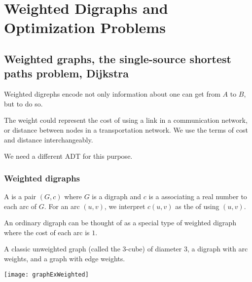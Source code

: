 \part{Weighted Digraphs and Optimization Problems}
\label{ch:weighted}


\chapter{Weighted graphs, the single-source shortest paths problem, Dijkstra} %

Weighted digrephs encode not only information about   one can get from $A$ to $B$, but
 to do so.

The weight could represent the cost of using a link
in a communication network, or distance between nodes in a
transportation network. We use the terms of cost and distance
interchangeably.

We need a different ADT for this purpose. 

\section{Weighted digraphs}
\label{sec:weighted}

\begin{Definition}
A  is a pair $(G, c)$ where $G$ is a digraph
and $c$ is a  associating a
real number to each arc of $G$. For an arc $(u,v)$, we interpret  $c(u, v)$ as the  of using $(u, v)$.
\end{Definition}

An ordinary digraph can be thought of as a special type of weighted digraph where the cost of each 
arc is $1$. 


\begin{Boxample}
A classic unweighted graph
(called the $3$-cube) of diameter $3$, a digraph with arc weights, and a
graph with edge weights.
\begin{center}
\texttt{[image: graphExWeighted]}
\end{center}
\end{Boxample}

